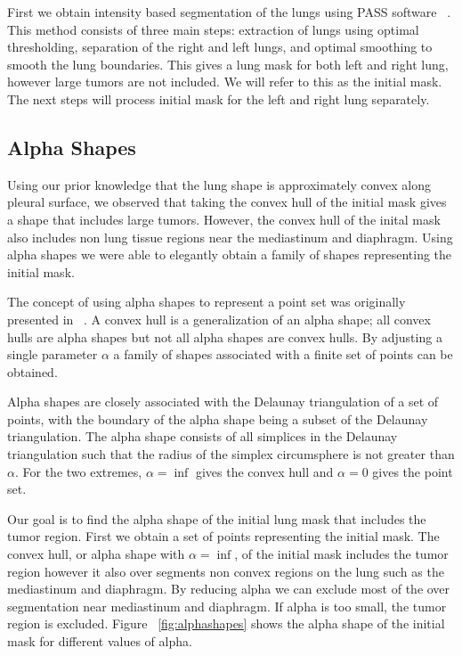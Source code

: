\documentclass{llncs}
\begin{document}
First we obtain intensity based segmentation of the lungs using PASS software ~\cite{guo2008}. This method consists of three main steps: extraction of lungs using optimal thresholding, separation of the right and left lungs, and optimal smoothing to smooth the lung boundaries. This gives a lung mask for both left and right lung, however large tumors are not included. We will refer to this as the initial mask. The next steps will process initial mask for the left and right lung separately. 
%
\subsection{Alpha Shapes}
%
Using our prior knowledge that the lung shape is approximately convex along pleural surface, we observed that taking the convex hull of the initial mask gives a shape that includes large tumors. However, the convex hull of the inital mask also includes non lung tissue regions near the mediastinum and diaphragm. Using alpha shapes we were able to elegantly obtain a family of shapes representing the initial mask. 

The concept of using alpha shapes to represent a point set was originally presented in ~\cite{edelsbrunner1983}. A convex hull is a generalization of an alpha shape; all convex hulls are alpha shapes but not all alpha shapes are convex hulls. By adjusting a single parameter $\alpha$ a family of shapes associated with a finite set of points can be obtained.

Alpha shapes are closely associated with the Delaunay triangulation of a set of points, with the boundary of the alpha shape being a subset of the Delaunay triangulation. The alpha shape consists of all simplices in the Delaunay triangulation such that the radius of the simplex circumsphere is not greater than $ \alpha $. For the two extremes, $ \alpha=\inf $ gives the convex hull and  $ \alpha=0 $ gives the point set. 

Our goal is to find the alpha shape of the initial lung mask that includes the tumor region. First we obtain a set of points representing the initial mask. The convex hull, or alpha shape with $ \alpha = \inf $, of the initial mask includes the tumor region however it also over segments non convex regions on the lung such as the mediastinum and diaphragm. By reducing alpha we can exclude most of the over segmentation near mediastinum and diaphragm. If alpha is too small, the tumor region is excluded. Figure ~\ref{fig:alphashapes} shows the alpha shape of the initial mask for different values of alpha. 
\end{document}
